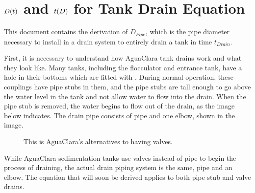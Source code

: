\documentclass[letterpaper,10pt,english]{sphinxmanual}
\let\sphinxpxdimen\pdfpxdimen\else\newdimen\sphinxpxdimen
\begin{document}
\section{\protect\(D(t)\protect\) and \protect\(t(D)\protect\) for Tank Drain Equation}
\label{\detokenize{Flow_Control_and_Measurement/FCM_Derivations:and-for-tank-drain-equation}}\label{\detokenize{Flow_Control_and_Measurement/FCM_Derivations:heading-diameter-and-time-tank-drain-equation}}
This document contains the derivation of \(D_{Pipe}\), which is the pipe diameter necessary to install in a drain system to entirely drain a tank in time \(t_{Drain}\).

First, it is necessary to understand how AguaClara tank drains work and what they look like. Many tanks, including the flocculator and entrance tank, have a hole in their bottoms which are fitted with . During normal operation, these couplings have pipe stubs in them, and the pipe stubs are tall enough to go above the water level in the tank and not allow water to flow into the drain. When the pipe stub is removed, the water begins to flow out of the drain, as the image below indicates. The drain pipe consists of pipe and one elbow, shown in the image.

\begin{figure}[htbp]
\centering
\capstart

\noindent\sphinxincludegraphics[width=600\sphinxpxdimen]{{pipe_stub_drainage}.png}
\caption{This is AguaClara’s alternatives to having valves.}\label{\detokenize{Flow_Control_and_Measurement/FCM_Derivations:id3}}\label{\detokenize{Flow_Control_and_Measurement/FCM_Derivations:figure-pipe-stub-drainage}}\end{figure}

While AguaClara sedimentation tanks use valves instead of pipe to begin the process of draining, the actual drain piping system is the same, pipe and an elbow. The equation that will soon be derived applies to both pipe stub and valve drains.
\end{document}

